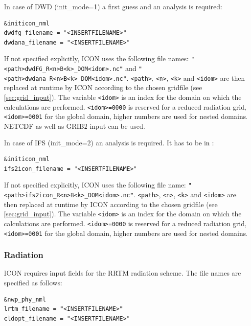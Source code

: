 In case of DWD (init\_mode=1) a first guess and an analysis is required: 
\begin{verbatim}
&initicon_nml
dwdfg_filename = "<INSERTFILENAME>"
dwdana_filename = "<INSERTFILENAME>"
\end{verbatim}

If not specified explicitly, ICON uses the following file names: \newline 
\verb+"<path>dwdFG_R<n>B<k>_DOM<idom>.nc"+ and \newline
\verb+"<path>dwdana_R<n>B<k>_DOM<idom>.nc"+. \newline
\verb+<path>+, \verb+<n>+, \verb+<k>+ and \verb+<idom>+ are then replaced at runtime by ICON according to the chosen gridfile (see \ref{sec:grid_input}). The variable \verb+<idom>+ is an index for the domain on which the calculations are performed. \verb+<idom>=0000+ is reserved for a reduced radiation grid, \verb+<idom>=0001+ for the global domain, higher numbers are used for nested domains. NETCDF as well as GRIB2 input can be used.

In case of IFS (init\_mode=2) an analysis is required. It has to be in \netcdf: 
\begin{verbatim}
&initicon_nml
ifs2icon_filename = "<INSERTFILENAME>"
\end{verbatim}

If not specified explicitly, ICON uses the following file name: \newline 
\verb+"<path>ifs2icon_R<n>B<k>_DOM<idom>.nc"+. \newline
\verb+<path>+, \verb+<n>+, \verb+<k>+ and \verb+<idom>+ are then replaced at runtime by ICON according to the chosen gridfile (see \ref{sec:grid_input}). The variable \verb+<idom>+ is an index for the domain on which the calculations are performed. \verb+<idom>=0000+ is reserved for a reduced radiation grid, \verb+<idom>=0001+ for the global domain, higher numbers are used for nested domains.

\subsubsection{Radiation}\label{InputReal:Rad}

ICON requires input fields for the RRTM radiation scheme. The file names are specified as follows:

\begin{verbatim}
&nwp_phy_nml
lrtm_filename = "<INSERTFILENAME>" 
cldopt_filename = "<INSERTFILENAME>"
\end{verbatim}

